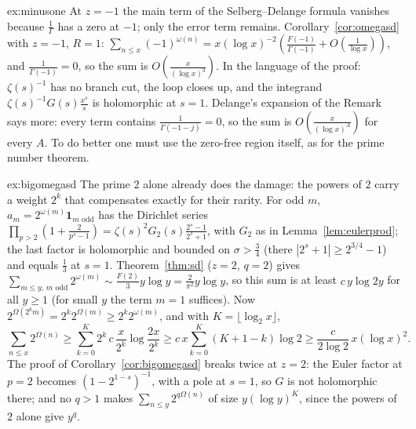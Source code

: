 \begin{solution}{ex:minusone}
\idea At $z=-1$ the main term of the Selberg--Delange formula vanishes because $\frac1\Gamma$ has a zero at $-1$; only the error term remains.
\writeup Corollary~\ref{cor:omegasd} with $z=-1$, $R=1$: $\sum_{n\le x}(-1)^{\omega(n)}=x(\log x)^{-2}(\frac{F(-1)}{\Gamma(-1)}+O(\frac1{\log x}))$, and $\frac1{\Gamma(-1)}=0$, so the sum is $O(\frac x{(\log x)^3})$. In the language of the proof: $\zeta(s)^{-1}$ has no branch cut, the loop closes up, and the integrand $\zeta(s)^{-1}G(s)\frac{x^s}s$ is holomorphic at $s=1$. Delange's expansion of the Remark says more: every term contains $\frac1{\Gamma(-1-j)}=0$, so the sum is $O(\frac x{(\log x)^A})$ for every $A$. To do better one must use the zero-free region itself, as for the prime number theorem.
\end{solution}

\begin{solution}{ex:bigomegasd}
\idea The prime $2$ alone already does the damage: the powers of $2$ carry a weight $2^k$ that compensates exactly for their rarity.
\writeup For odd $m$, $a_m=2^{\omega(m)}\mathbf 1_{m\text{ odd}}$ has the Dirichlet series $\prod_{p>2}(1+\frac2{p^s-1})=\zeta(s)^2G_2(s)\frac{2^s-1}{2^s+1}$, with $G_2$ as in Lemma~\ref{lem:eulerprod}; the last factor is holomorphic and bounded on $\sigma>\frac34$ (there $|2^s+1|\ge2^{3/4}-1$) and equals $\frac13$ at $s=1$. Theorem~\ref{thm:sd} ($z=2$, $q=2$) gives $\sum_{m\le y,\,m\text{ odd}}2^{\omega(m)}\sim\frac{F(2)}3y\log y=\frac2{\pi^2}y\log y$, so this sum is at least $c\,y\log2y$ for all $y\ge1$ (for small $y$ the term $m=1$ suffices). Now $2^{\Omega(2^km)}=2^k2^{\Omega(m)}\ge2^k2^{\omega(m)}$, and with $K=\lfloor\log_2x\rfloor$,
\[
\sum_{n\le x}2^{\Omega(n)}\ge\sum_{k=0}^K2^k\,c\,\frac x{2^k}\log\frac{2x}{2^k}\ge c\,x\sum_{k=0}^K(K+1-k)\log2\ge\frac c{2\log2}\,x(\log x)^2.
\]
The proof of Corollary~\ref{cor:bigomegasd} breaks twice at $z=2$: the Euler factor at $p=2$ becomes $(1-2^{1-s})^{-1}$, with a pole at $s=1$, so $G$ is not holomorphic there; and no $q>1$ makes $\sum_{n\le y}2^{q\Omega(n)}$ of size $y(\log y)^K$, since the powers of $2$ alone give $y^q$.
\end{solution}

